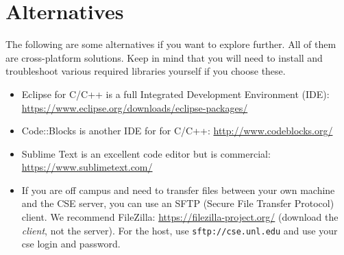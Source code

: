 \documentclass[12pt]{scrartcl}
\begin{document}
\section*{Alternatives}

The following are some alternatives if you want to explore further.
All of them are cross-platform solutions.  Keep in mind that you will
need to install and troubleshoot various required libraries yourself if
you choose these.
\begin{itemize} 
  \item Eclipse for C/C++ is a full Integrated Development Environment (IDE):
  \url{https://www.eclipse.org/downloads/eclipse-packages/}
  \item Code::Blocks is another IDE for for C/C++: \url{http://www.codeblocks.org/}
  \item Sublime Text is an excellent code editor but is commercial: \url{https://www.sublimetext.com/}
  \item If you are off campus and need to transfer files between your 
  own machine and the CSE server, you can use an SFTP (Secure File Transfer
  Protocol) client.  We recommend FileZilla: \url{https://filezilla-project.org/}
  (download the \emph{client}, not the server).  For the host, use 
  \texttt{sftp://cse.unl.edu} and use your cse login and password.
\end{itemize}


  
\end{document}
